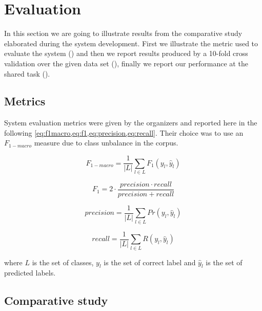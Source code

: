 \section{Evaluation} \label{sec:evaluation}

In this section we are going to illustrate results from the comparative study elaborated during the system development. First we illustrate the metric used to evaluate the system () and then we report results produced by a 10-fold cross validation over the given data set (), finally we report our performance at the shared task ().

\subsection{Metrics} \label{subsec:metric}

System evaluation metrics were given by the organizers and reported here in the following \cref{eq:f1macro,eq:f1,eq:precision,eq:recall}. Their choice was to use an $F_{1-macro}$ measure due to class unbalance in the corpus.

\begin{multicols}{2}
\begin{equation} \label{eq:f1macro}
F_{1-macro} = \frac{1}{|L|} \displaystyle\sum_{l\in L} F_1(y_l, \hat{y}_l)
\end{equation}

\begin{equation} \label{eq:f1}
F_1 = 2 \cdot \frac{precision \cdot recall }{precision + recall}
\end{equation}

\begin{equation} \label{eq:precision}
precision = \frac{1}{|L|} \displaystyle\sum_{l\in L} Pr(y_l, \hat{y}_l)
\end{equation}

\begin{equation} \label{eq:recall}
recall = \frac{1}{|L|} \displaystyle\sum_{l\in L} R(y_l, \hat{y}_l)
\end{equation}
\end{multicols}

\noindent where $L$ is the set of classes, $y_l$ is the set of correct label and $\hat{y}_l$ is the set of predicted labels.


\subsection{Comparative study} \label{subsec:study}

